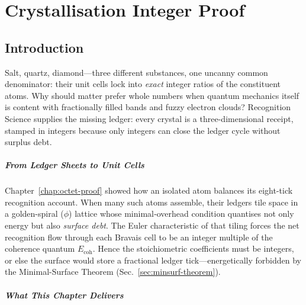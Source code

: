\documentclass[11pt,oneside]{book}
\begin{document}
\bigskip
\chapter{Crystallisation Integer Proof}
\label{chap:crystal-integer}

\section*{Introduction}



Salt, quartz, diamond—three different substances, one uncanny common
denominator: their unit cells lock into \emph{exact} integer ratios of the
constituent atoms.  
Why should matter prefer whole numbers when quantum mechanics itself is
content with fractionally filled bands and fuzzy electron clouds?  
Recognition Science supplies the missing ledger: every crystal is a
three-dimensional receipt, stamped in integers because only integers can
close the ledger cycle without surplus debt.

\paragraph*{From Ledger Sheets to Unit Cells}

Chapter~\ref{chap:octet-proof} showed how an isolated atom balances its
eight-tick recognition account.  
When many such atoms assemble, their ledgers tile space in a golden-spiral
(\(\phi\)) lattice whose minimal‐overhead condition quantises not only
energy but also \emph{surface debt}.  
The Euler characteristic of that tiling forces the net recognition flow
through each Bravais cell to be an integer multiple of the coherence
quantum \(E_{\text{coh}}\).  
Hence the stoichiometric coefficients must be integers, or else the
surface would store a fractional ledger tick—energetically forbidden by
the Minimal-Surface Theorem (Sec.~\ref{sec:minsurf-theorem}).

\paragraph*{What This Chapter Delivers}
\end{document}
